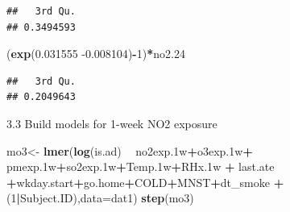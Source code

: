 \documentclass[12pt,]{article}
\newenvironment{Shaded}{\begin{snugshade}}{\end{snugshade}}
\newcommand{\DataTypeTok}[1]{\textcolor[rgb]{0.13,0.29,0.53}{#1}}
\newcommand{\DecValTok}[1]{\textcolor[rgb]{0.00,0.00,0.81}{#1}}
\newcommand{\FloatTok}[1]{\textcolor[rgb]{0.00,0.00,0.81}{#1}}
\newcommand{\KeywordTok}[1]{\textcolor[rgb]{0.13,0.29,0.53}{\textbf{#1}}}
\newcommand{\NormalTok}[1]{#1}
\newcommand{\OperatorTok}[1]{\textcolor[rgb]{0.81,0.36,0.00}{\textbf{#1}}}
\newcommand{\StringTok}[1]{\textcolor[rgb]{0.31,0.60,0.02}{#1}}
\begin{document}
\begin{verbatim}
##   3rd Qu. 
## 0.3494593
\end{verbatim}

\begin{Shaded}
\begin{Highlighting}[]
\NormalTok{(}\KeywordTok{exp}\NormalTok{(}\FloatTok{0.031555} \FloatTok{-0.008104}\NormalTok{)}\OperatorTok{-}\DecValTok{1}\NormalTok{)}\OperatorTok{*}\NormalTok{no2}\FloatTok{.24}
\end{Highlighting}
\end{Shaded}

\begin{verbatim}
##   3rd Qu. 
## 0.2049643
\end{verbatim}

3.3 Build models for 1-week NO2 exposure

\begin{Shaded}
\begin{Highlighting}[]
\NormalTok{mo3<-}\StringTok{ }\KeywordTok{lmer}\NormalTok{(}\KeywordTok{log}\NormalTok{(is.ad) }\OperatorTok{~}\StringTok{ }\NormalTok{no2exp}\FloatTok{.1}\NormalTok{w}\OperatorTok{+}\NormalTok{o3exp}\FloatTok{.1}\NormalTok{w}\OperatorTok{+}\StringTok{ }\NormalTok{pmexp}\FloatTok{.1}\NormalTok{w}\OperatorTok{+}\NormalTok{so2exp}\FloatTok{.1}\NormalTok{w}\OperatorTok{+}\NormalTok{Temp}\FloatTok{.1}\NormalTok{w}\OperatorTok{+}\NormalTok{RHx}\FloatTok{.1}\NormalTok{w }\OperatorTok{+}\StringTok{ }\NormalTok{last.ate }\OperatorTok{+}\NormalTok{wkday.start}\OperatorTok{+}\NormalTok{go.home}\OperatorTok{+}\NormalTok{COLD}\OperatorTok{+}\NormalTok{MNST}\OperatorTok{+}\NormalTok{dt_smoke }\OperatorTok{+}\NormalTok{(}\DecValTok{1}\OperatorTok{|}\NormalTok{Subject.ID),}\DataTypeTok{data=}\NormalTok{dat1)}
\KeywordTok{step}\NormalTok{(mo3)}
\end{Highlighting}
\end{Shaded}
\end{document}
